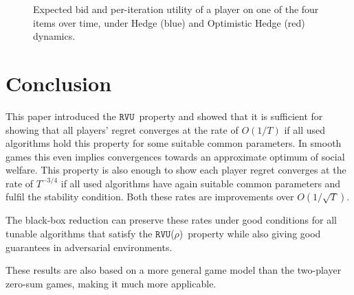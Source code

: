 \documentclass[a4paper]{article}
\theoremstyle{definition}
\newcommand{\myprop}{\ensuremath{\texttt{RVU}}}
\newcommand{\knob}{\ensuremath{\rho}}
\begin{document}
\begin{figure}[p]
\centering
{}
\quad
{}
\caption{Expected bid and per-iteration utility of a player on one of
  the four items over time, under Hedge (blue) and {Optimistic Hedge}
  (red) dynamics.}\label{fig:bids}
\end{figure}


\section{Conclusion}

This paper introduced the \myprop~property and showed that it is
sufficient for showing that all players' regret converges at the rate of
$O(1/T)$ if all used algorithms hold this property for some suitable common
parameters.
In smooth games this even implies convergences towards an approximate
optimum of social welfare.
This property is also enough to show each player regret converges at
the rate of $T^{-3/4}$ if all used algorithms have again suitable
common parameters and fulfil the stability condition.
Both these rates are improvements over $O(1/\sqrt{T})$.

The black-box reduction can preserve these rates under good conditions
for all tunable algorithms that satisfy the \myprop(\knob)~property
while also giving good guarantees in adversarial environments.

These results are also based on a more general game model than the
two-player zero-sum games, making it much more applicable.
\end{document}
